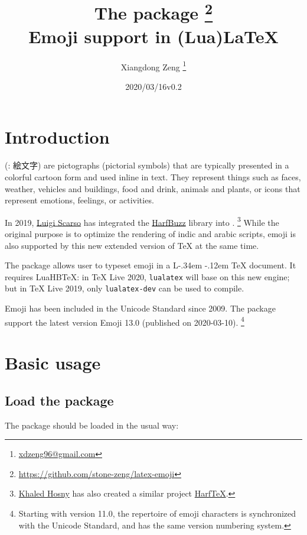 \documentclass{l3doc}
\title{The \pkg{emoji} package \thanks{\url{https://github.com/stone-zeng/latex-emoji}} \\
  Emoji support in (Lua)\LaTeX}
\author{Xiangdong Zeng \thanks{\url{xdzeng96@gmail.com}}}
\date{\emoji{date} 2020/03/16\quad v0.2}
\DeclareRobustCommand{\LaTeX}{
  L\kern-.34em
  \raisebox{.36ex}{\scalebox{0.9}{\textsc{a}}}
  \kern-.12em
  \TeX}
\newcounter { emoji }
\def\LuaHBTeX{LuaHB\TeX}
\begin{document}
\maketitle

\tableofcontents

\section{ Introduction}

 (: {\fontja 絵文字}) are pictographs (pictorial symbols) that are
typically presented in a colorful cartoon form and used inline in text. They represent things
such as faces, weather, vehicles and buildings, food and drink, animals and plants, or icons
that represent emotions, feelings, or activities.\textsuperscript{\cite{utr51}}

In 2019, \href{https://github.com/luigiScarso}{Luigi Scarso} has integrated the
\href{https://github.com/harfbuzz/harfbuzz}{HarfBuzz} library into \LuaTeX.%
\footnote{\href{https://github.com/khaledhosny}{Khaled Hosny} has also created a similar project
  \href{https://github.com/khaledhosny/harftex}{HarfTeX}.}
While the original purpose is to optimize the rendering of indic and arabic scripts, emoji is
also supported by this new extended version of \TeX{} at the same time.

The  package allows user to typeset emoji in a \LaTeX{} document. It requires
\LuaHBTeX{}: in \TeX{} Live 2020, \texttt{lualatex} will base on this new engine; but in
\TeX{} Live 2019, only \texttt{lualatex-dev} can be used to compile.

Emoji has been included in the Unicode Standard since 2009. The  package support
the latest version Emoji 13.0 (published on 2020-03-10).%
\footnote{Starting with version 11.0, the repertoire of emoji characters is synchronized with
  the Unicode Standard, and has the same version numbering system.}

\section{ Basic usage}

\subsection{ Load the package}

The package should be loaded in the usual way:
\end{document}
